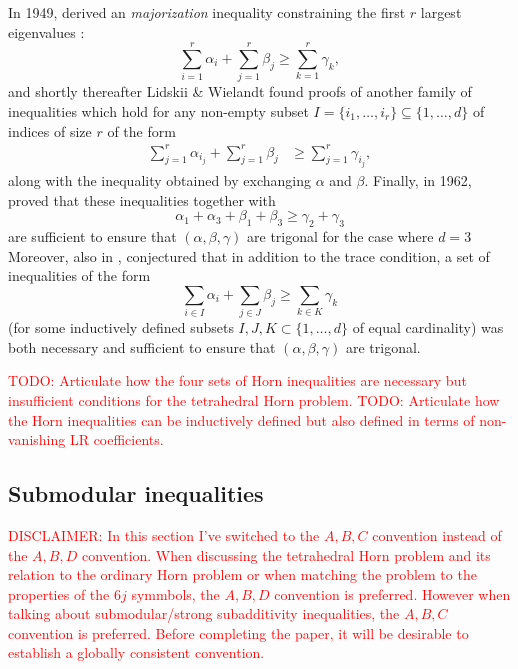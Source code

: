 \documentclass[notitlepage, 10pt]{article}
\begin{document}
In 1949, \citeauthor{fan1949theorem} derived an \textit{majorization} inequality constraining the first $r$ largest eigenvalues \cite{fan1949theorem}:
\begin{equation}
    {\sum}_{i=1}^{r}\alpha_i + {\sum}_{j=1}^{r}\beta_j \geq {\sum}_{k=1}^{r}\gamma_k,
\end{equation}
and shortly thereafter Lidskii \& Wielandt found proofs of another family of inequalities which hold for any non-empty subset $I = \{i_1, \ldots, i_r\} \subseteq \{1,\ldots, d\}$ of indices of size $r$ of the form
\begin{align}
    {\sum}_{j=1}^{r}\alpha_{i_j} + {\sum}_{j=1}^{r}\beta_j &\geq {\sum}_{j=1}^{r}\gamma_{i_j},
\end{align}
along with the inequality obtained by exchanging $\alpha$ and $\beta$.
Finally, in 1962, \citeauthor{horn1962eigenvalues} proved that these inequalities together with
\begin{equation}
    \alpha_1 + \alpha_3 + \beta_1 + \beta_3 \geq \gamma_2 + \gamma_3
\end{equation}
are sufficient to ensure that $(\alpha,\beta,\gamma)$ are trigonal for the case where $d=3$ \cite{horn1962eigenvalues}
Moreover, also in \cite{horn1962eigenvalues}, \citeauthor{horn1962eigenvalues} conjectured that in addition to the trace condition, a set of inequalities of the form
\begin{equation}
    {\sum}_{i\in I} \alpha_i + {\sum}_{j\in J} \beta_j \geq {\sum}_{k\in K} \gamma_{k}
\end{equation}
(for some inductively defined subsets $I,J,K \subset \{1,\ldots, d\}$ of equal cardinality)
was both necessary and sufficient to ensure that $(\alpha,\beta,\gamma)$ are trigonal.

\textcolor{red}{TODO: Articulate how the four sets of Horn inequalities are necessary but insufficient conditions for the tetrahedral Horn problem.}
\textcolor{red}{TODO: Articulate how the Horn inequalities can be inductively defined but also defined in terms of non-vanishing LR coefficients.}

\subsection{Submodular inequalities}

\textcolor{red}{DISCLAIMER: In this section I've switched to the $A,B,C$ convention instead of the $A,B,D$ convention. When discussing the tetrahedral Horn problem and its relation to the ordinary Horn problem or when matching the problem to the properties of the $6j$ symmbols, the $A,B,D$ convention is preferred. However when talking about submodular/strong subadditivity inequalities, the $A,B,C$ convention is preferred. Before completing the paper, it will be desirable to establish a globally consistent convention.}
\end{document}
